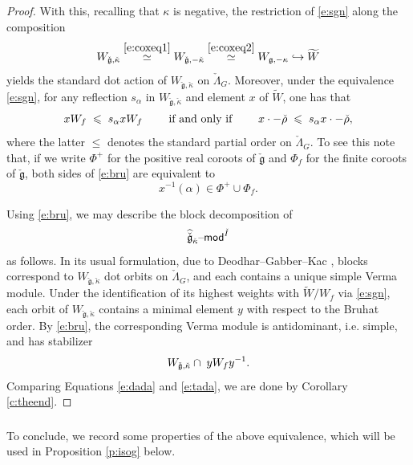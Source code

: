 \documentclass[11pt,reqno]{amsart}
\newcommand{\cgk}{\widehat{\check{\mathfrak{g}}}_{\check{\kappa}}}
\newcommand{\fg}{\mathfrak{g}}
\theoremstyle{remark}
\numberwithin{equation}{section}
\renewcommand{\mod}{\text{\textendash}\mathsf{mod}}
\begin{document}
\begin{proof}
	With this, recalling that $\kappa$ is negative, the restriction of 
	\eqref{e:sgn} along the composition
	\[
	W_{\check{\fg}, \check{\kappa}} \overset{\eqref{e:coxeq1}}{\simeq} 
	W_{\check{\fg}, -\check{\kappa}} \overset{\eqref{e:coxeq2}}{\simeq} W_{\fg, 
		-\kappa} \hookrightarrow \widetilde{W} 
	\]
	yields the standard dot action of $W_{\check{\fg}, \check{\kappa}}$ on 
	$\check{\Lambda}_G$. Moreover, under the equivalence \eqref{e:sgn}, for any 
	reflection $s_\alpha$ in $W_{\check{\fg}, \check{\kappa}}$ and element $x$ 
	of 
	$\widetilde{W}$, one has that
	\begin{equation} \label{e:bru} xW_f \hspace{1mm}\leqslant 
	\hspace{1mm}s_\alpha 
	x W_f \quad\quad \text{ if 
		and 
		only if } \quad\quad  x 
	\cdot-\check{\rho}\hspace{1mm} 
	\leqslant\hspace{1mm} s_\alpha x \cdot - \check{\rho}, \end{equation}
	where the latter $\leqslant$ denotes the standard partial order on 
	$\check{\Lambda}_G$. To see this note that, if we write $\Phi^+$ for the 
	positive real coroots of $\check{\fg}$ and $\Phi_f$ for the finite coroots 
	of 
	$\check{\fg}$, both sides of \eqref{e:bru} are equivalent to 
	\[ x^{-1}(\alpha) \in \Phi^+ \cup \Phi_f.
	\]
	
	Using \eqref{e:bru}, we may describe the block decomposition of 
	\[ \cgk\mod^{\check{I}}
	\]
	as follows. In its usual formulation, due to Deodhar--Gabber--Kac 
	\cite{dgk}, blocks correspond to $W_{\check{\fg}, \check{\kappa}}$ dot 
	orbits on $\check{\Lambda}_G$, and each contains a unique simple Verma 
	module. Under the identification of its highest weights with 
	$\widetilde{W}/W_f$ via \eqref{e:sgn}, each orbit of $W_{\check{\fg}, 
		\check{\kappa}}$ contains a minimal element $y$ with respect to the 
		Bruhat 
	order. By \eqref{e:bru}, the corresponding Verma module is antidominant, 
	i.e. simple, and has stabilizer 
	\begin{equation} \label{e:tada} W_{\check{\fg}, \check{\kappa}} \cap 
	\hspace{1mm} y W_f 
	y^{-1}.
	\end{equation}
	Comparing Equations \eqref{e:dada} and \eqref{e:tada}, we are done by 
	Corollary \ref{c:theend}. 
\end{proof}

\subsubsection{}
To conclude, we record some properties of the above equivalence, which will be 
used in Proposition \ref{p:isog} below.
\end{document}
